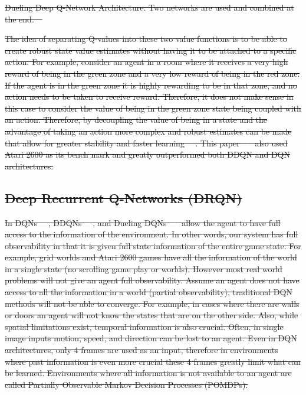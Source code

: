 \documentclass[12pt,american]{report}
\providecommand{\DIFdeltex}[1]{{\protect\color{red}\sout{#1}}}                      %
\providecommand{\DIFdelFL}[1]{\DIFdel{#1}} %
\providecommand{\DIFdel}[1]{\texorpdfstring{\DIFdeltex{#1}}{}} %
\begin{document}
{%
\DIFdelFL{Dueling Deep Q-Network Architecture. Two networks are used and combined at the end.~\mbox{%
\cite{wang2015dueling}}%
}}

\DIFdel{The idea of separating Q-values into these two value functions is to be able to create robust state value estimates without having it to be attached to a specific action.  For example, consider an agent in a room where it receives a very high reward of being in the green zone and a very low reward of being in the red zone. If the agent is in the green zone it is highly rewarding to be in that zone, and no action needs to be taken to receive reward. Therefore, it does not make sense in this case to consider the value of being in the green zone state being coupled with an action. Therefore, by decoupling the value of being in a state and the advantage of taking an action more complex and robust estimates can be made that allow for greater stability and faster learning~\mbox{%
\cite{wang2015dueling}}%
. This paper~\mbox{%
\cite{wang2015dueling} }%
also used Atari 2600 as its bench mark and greatly outperformed both DDQN and DQN architectures. 
}%

\subsection{\DIFdel{Deep Recurrent Q-Networks (DRQN)}}
\addtocounter{subsection}{-1}%
\DIFdel{In DQNs~\mbox{%
\cite{atari}}%
, DDQNs~\mbox{%
\cite{van2016deep}}%
, and Dueling DQNs~\mbox{%
\cite{wang2015dueling} }%
allow the agent to have full access to the information of the environment. In other words, our system has full observability in that it is given full state information of the entire game state.  For example, grid worlds and Atari 2600 games have all the information of the world in a single state (no scrolling game play or worlds). However most real world problems will not give an agent full observability. Assume an agent does not have access to all the information in a world (partial observability), traditional DQN methods will not be able to converge. For example, in cases where there are walls or doors an agent will not know the states that are on the other side. Also, while spatial limitations exist, temporal information is also crucial.  Often, in single image inputs motion, speed, and direction can be lost to an agent. Even in DQN architectures, only 4 frames are used as an input, therefore in environments where past information is even more crucial these 4 frames greatly limit what can be learned. Environments where all information is not available to an agent are called Partially Observable Markov Decision Processes (POMDPs).  
}%
\end{document}
